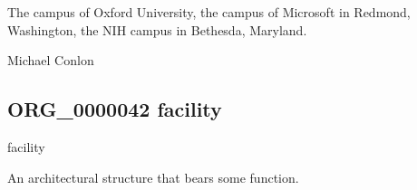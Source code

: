 \documentclass[letterpaper,10pt,english]{sphinxmanual}
\begin{document}
\begin{sphinxShadowBox}

\sphinxAtStartPar
The campus of Oxford University, the campus of Microsoft in Redmond, Washington, the NIH campus in Bethesda, Maryland.
\end{sphinxShadowBox}

\begin{sphinxShadowBox}

\sphinxAtStartPar
{}
\end{sphinxShadowBox}

\begin{sphinxShadowBox}

\sphinxAtStartPar
Michael Conlon 
\end{sphinxShadowBox}
\begin{quote}

\ignorespaces \end{quote}


\subsection{ORG\_0000042 \sphinxhyphen{} facility}
\label{\detokenize{doc-ORG_0000042:org-0000042-facility}}\label{\detokenize{doc-ORG_0000042:index-0}}\label{\detokenize{doc-ORG_0000042::doc}}
\begin{sphinxShadowBox}

\sphinxAtStartPar
facility
\end{sphinxShadowBox}

\begin{sphinxShadowBox}

\sphinxAtStartPar
{\hyperref[\detokenize{doc-ORG_0000040::doc}]{}}
\end{sphinxShadowBox}

\begin{sphinxShadowBox}

\sphinxAtStartPar
An architectural structure that bears some function.
\end{sphinxShadowBox}
\end{document}

